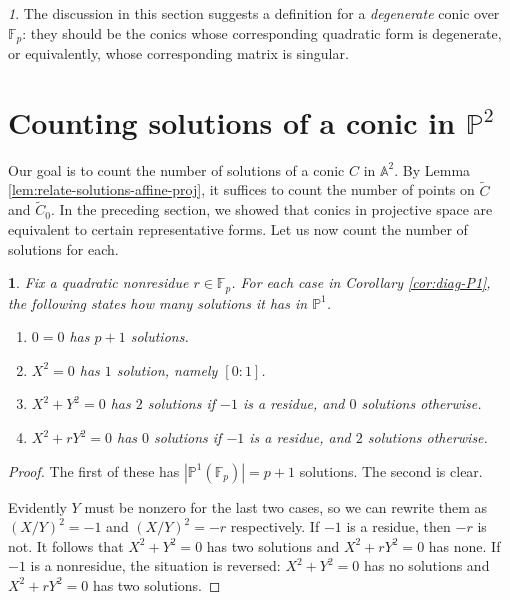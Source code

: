 \documentclass[10pt,a4paper]{amsart}
\numberwithin{equation}{section}
\numberwithin{figure}{section}
\theoremstyle{definition}
\theoremstyle{plain}
\theoremstyle{remark}
\newtheorem*{rem*}{\protect\remarkname}
\theoremstyle{plain}
\theoremstyle{definition}
\theoremstyle{plain}
\newtheorem{prop}[thm]{\protect\propositionname}
\theoremstyle{plain}
\providecommand{\propositionname}{Proposition}
\providecommand{\remarkname}{Remark}
\newcommand{\A}{\mathbb{A}}
\renewcommand{\P}{\mathbb{P}}
\newcommand{\F}{\mathbb{F}}
\begin{document}
	\begin{rem*}
		The discussion in this section suggests a definition for a \emph{degenerate} conic over $\F_p$: they should be the conics whose corresponding quadratic form is degenerate, or equivalently, whose corresponding matrix is singular.
	\end{rem*}

    \section{Counting solutions of a conic in $\P^2$}\label{sec:proj-solutions}
	Our goal is to count the number of solutions of a conic $C$ in $\A^2$. By Lemma \ref{lem:relate-solutions-affine-proj}, it suffices to count the number of points on $\widetilde{C}$ and $\widetilde{C}_0$. In the preceding section, we showed that conics in projective space are equivalent to certain representative forms. Let us now count the number of solutions for each.
	\begin{prop}\label{prop:counting-P1-solutions}
		Fix a quadratic nonresidue $r \in \F_p$. For each case in Corollary \ref{cor:diag-P1}, the following states how many solutions it has in $\P^1$.
		\begin{enumerate} 
			\item\label{case:0} $0 = 0$ has $p+1$ solutions.
			\item $X^2 = 0$ has $1$ solution, namely $[0:1]$.
			\item $X^2 + Y^2 = 0$ has $2$ solutions if $-1$ is a residue, and $0$ solutions otherwise. \label{case:x^2+y^2=0}
			\item $X^2 + rY^2 = 0$ has $0$ solutions if $-1$ is a residue, and $2$ solutions otherwise.
		\end{enumerate}
	\end{prop}
	\begin{proof}
		The first of these has $|\P^1(\F_p)| = p+1$ solutions. The second is clear.
		
		Evidently $Y$ must be nonzero for the last two cases, so we can rewrite them as
		$(X/Y)^2 = -1$ and $(X/Y)^2 = -r$ respectively. If $-1$ is a residue,
		then $-r$ is not. It follows that $X^2 + Y^2 = 0$ has two solutions and $X^2 +
		rY^2 = 0$ has none. If $-1$ is a nonresidue, the situation is reversed: $X^2 +
		Y^2 = 0$ has no solutions and $X^2 + rY^2 = 0$ has two solutions.
	\end{proof}
\end{document}
